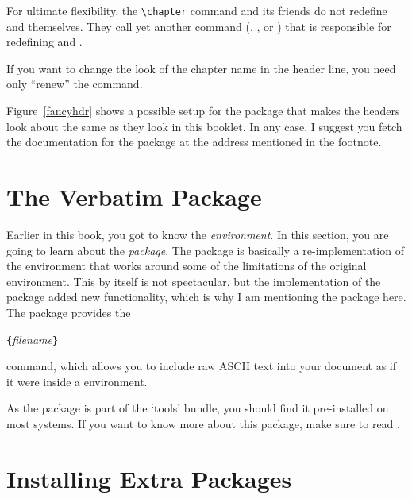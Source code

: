 For ultimate flexibility, the \verb|\chapter| command and its friends
do not redefine  and  themselves. They call
yet another command (, , or
) that is responsible for redefining 
and .

If you want to change the look of the chapter
name in the header line, you need only ``renew'' the 
command. 


Figure~\ref{fancyhdr} shows a possible setup for the 
package that makes the headers look about the same as they look in
this booklet. In any case, I suggest you fetch the documentation for
the package at the address mentioned in the footnote.

\section{The Verbatim Package}

Earlier in this book, you got to know the 
\emph{environment}.  In this section, you are going to learn about the
 \emph{package}. The  package is basically
a re-implementation of the  environment that works around
some of the limitations of the original  environment.
This by itself is not spectacular, but the implementation of the
 package added new functionality, which is
why I am mentioning the package here. The 
package provides the

\begin{lscommand}
\verb|{|\emph{filename}\verb|}|
\end{lscommand}

\noindent command, which allows you to include raw ASCII text into your
document as if it were inside a  environment.

As the  package is part of the `tools' bundle, you
should find it pre-installed on most systems. If you want to know more
about this package, make sure to read \cite{verbatim}.


\section{Installing Extra Packages}\label{sec:Packages}

